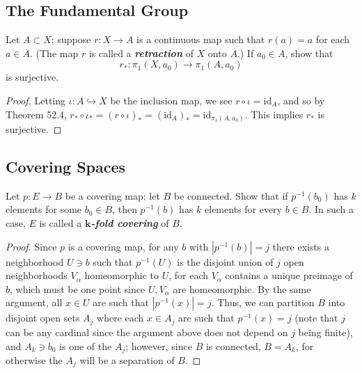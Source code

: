 \documentclass[12pt]{article}
\theoremstyle{remark}
\begin{document}
\subsection{The Fundamental Group}
\setcounter{subsubsection}{3}
\begin{problem}
  Let $A \subset X$; suppose $r\colon X \to A$ is a continuous map such that
  $r(a) = a$ for each $a \in A$. (The map $r$ is called a
  \emph{\textbf{retraction}} of $X$ onto $A$.) If $a_0 \in A$, show that
  \begin{equation*}
    r_*\colon \pi_1(X,a_0) \longrightarrow \pi_1(A,a_0)
  \end{equation*}
  is surjective.
\end{problem}
\begin{proof}
  Letting $\iota\colon A \hookrightarrow X$ be the inclusion map, we see $r \circ \iota = \mathrm{id}_A$, and so by Theorem 52.4, $r_* \circ \iota_* = (r \circ \iota)_* = (\mathrm{id}_A)_* = \mathrm{id}_{\pi_1(A,a_0)}$. This implies $r_*$ is surjective.
\end{proof}

\subsection{Covering Spaces}
\setcounter{subsubsection}{2}
\begin{problem}
  Let $p\colon E \to B$ be a covering map; let $B$ be connected. Show that if
  $p^{-1}(b_0)$ has $k$ elements for some $b_0 \in B$, then $p^{-1}(b)$ has $k$
  elements for every $b \in B$. In such a case, $E$ is called a
  \emph{\textbf{$\bm{k}$-fold covering}} of $B$.
\end{problem}
\begin{proof}
  Since $p$ is a covering map, for any $b$ with $|p^{-1}(b)| = j$ there exists a
  neighborhood $U \ni b$ such that $p^{-1}(U)$ is the disjoint union of $j$ open
  neighborhoods $V_\alpha$ homeomorphic to $U$, for each $V_\alpha$ contains a
  unique preimage of $b$, which must be one point since $U,V_\alpha$ are
  homeomorphic. By the same argument, all $x \in U$ are such that $|p^{-1}(x)| =
  j$. Thus, we can partition $B$ into disjoint open sets $A_j$ where each $x \in
  A_j$ are such that $p^{-1}(x) = j$ (note that $j$ can be any cardinal since
  the argument above does not depend on $j$ being finite), and $A_k \ni b_0$ is
  one of the $A_j$; however, since $B$ is connected, $B = A_k$, for otherwise
  the $A_j$ will be a separation of $B$.
\end{proof}
\end{document}
